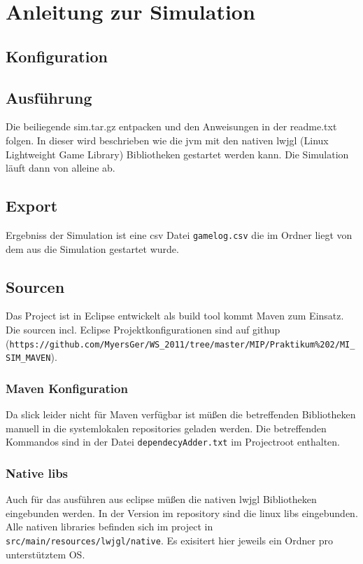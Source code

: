 \documentclass[10pt]{scrartcl}
\author{André Harms, Oliver Steenbuck, Armin Steudte  \\ Carsten Noetzel, Dennis Blauhut, Torben Becker}
\title{\titletext}
\date{11.01.2012}
\begin{document}
\maketitle

\setcounter{tocdepth}{3}
\tableofcontents

	\listoftables                                 												%
	\listoffigures   

\section{Anleitung zur Simulation}
\subsection{Konfiguration}
\subsection{Ausführung}
Die beiliegende sim.tar.gz entpacken und den Anweisungen in der readme.txt folgen.
In dieser wird beschrieben wie die jvm mit den nativen lwjgl (Linux Lightweight Game Library) Bibliotheken gestartet werden kann. Die Simulation läuft dann von alleine ab.
\subsection{Export}
Ergebniss der Simulation ist eine csv Datei \verb!gamelog.csv! die im Ordner liegt von dem aus die Simulation gestartet wurde.


\subsection{Sourcen}
Das Project ist in Eclipse entwickelt als build tool kommt Maven zum Einsatz. Die sourcen incl. Eclipse Projektkonfigurationen sind auf githup (\verb!https://github.com/MyersGer/WS_2011/tree/master/MIP/Praktikum%202/MI_SIM_MAVEN!).

\subsubsection{Maven Konfiguration}
Da slick leider nicht für Maven verfügbar ist müßen die betreffenden Bibliotheken manuell in die systemlokalen repositories geladen werden. Die betreffenden Kommandos sind in der Datei \verb!dependecyAdder.txt! im Projectroot enthalten.

\subsubsection{Native libs}
Auch für das ausführen aus eclipse müßen die nativen lwjgl Bibliotheken eingebunden werden. In der Version im repository sind die linux libs eingebunden. Alle nativen libraries befinden sich im project in \verb!src/main/resources/lwjgl/native!. Es exisitert hier jeweils ein Ordner pro unterstütztem OS.
\end{document}
